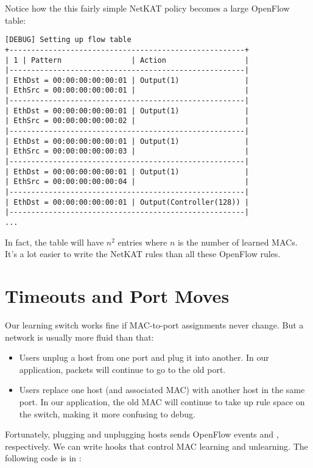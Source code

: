 Notice how the this fairly simple NetKAT policy becomes a large OpenFlow table:

\begin{verbatim}
[DEBUG] Setting up flow table
+------------------------------------------------------+
| 1 | Pattern                | Action                  |
|------------------------------------------------------|
| EthDst = 00:00:00:00:00:01 | Output(1)               |
| EthSrc = 00:00:00:00:00:01 |                         |
|------------------------------------------------------|
| EthDst = 00:00:00:00:00:01 | Output(1)               |
| EthSrc = 00:00:00:00:00:02 |                         |
|------------------------------------------------------|
| EthDst = 00:00:00:00:00:01 | Output(1)               |
| EthSrc = 00:00:00:00:00:03 |                         |
|------------------------------------------------------|
| EthDst = 00:00:00:00:00:01 | Output(1)               |
| EthSrc = 00:00:00:00:00:04 |                         |
|------------------------------------------------------|
| EthDst = 00:00:00:00:00:01 | Output(Controller(128)) |
|------------------------------------------------------|
...
\end{verbatim}

In fact, the table will have $n^2$ entries where $n$ is the number of learned MACs.  It's a lot easier
to write the NetKAT rules than all these OpenFlow rules.  

\section{Timeouts and Port Moves}
\label{l2_learning_switch:timeouts}

Our learning switch works fine if MAC-to-port assignments never change.  But a network is usually
more fluid than that:

\begin{itemize}
\item Users unplug a host from one port and plug it into another.  In our application, packets will
continue to go to the old port.
\item Users replace one host (and associated MAC) with another host in the same port.  In our application, the
old MAC will continue to take up rule space on the switch, making it more confusing to debug. 
\end{itemize}

Fortunately, plugging and unplugging hosts sends OpenFlow events  and ,
respectively.  We can write hooks that control MAC learning and unlearning.  The following
code is in :

